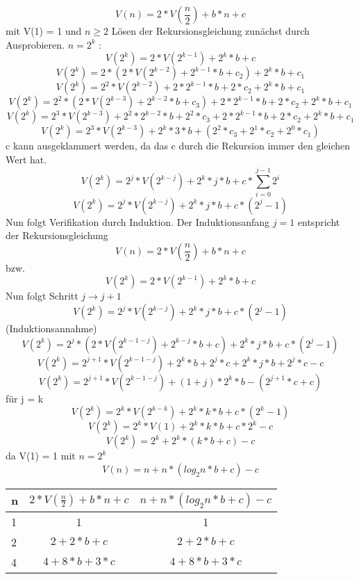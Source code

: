 \documentclass{article}
\begin{document}
\section{}
\[V(n) = 2* V\left(\frac{n}{2}\right)+ b*n +c \] mit V(1) = 1 und $n \geq 2$
\newline
Lösen der Rekursionsgleichung zunächst durch Ausprobieren.
$n = 2^k$ : \[V(2^k) = 2* V\left(2^{k-1}\right)+  2^k*b +c \] 
\[V(2^k) = 2* \left(2*V\left(2^{k-2}\right)+2^{k-1}*b+c_2\right )+  2^k*b +c_1 \] 
\[V(2^k) = 2^2*V\left(2^{k-2}\right)+2*2^{k-1}*b+2*c_2+  2^k*b +c_1 \] 
\[V(2^k) = 2^2*\left(2*V\left(2^{k-3}\right)+2^{k-2}*b+c_3\right)+2*2^{k-1}*b+2*c_2+  2^k*b +c_1 \] 
\[V(2^k) = 2^3*V\left(2^{k-3}\right)+2^2*2^{k-2}*b+2^2*c_3+2*2^{k-1}*b+2*c_2+  2^k*b +c_1 \] 
\[V(2^k) = 2^3*V\left(2^{k-3}\right)+2^{k}*3*b+(2^2*c_3+2^1*c_2+ 2^0*c_1) \] 
\newline
c kann ausgeklammert werden, da das c durch die Rekursion immer den gleichen Wert hat.
\[V(2^k) = 2^j*V\left(2^{k-j}\right)+2^{k}*j*b+ c*\sum_{i=0}^{j-1}{2^i} \] 
\[V(2^k) = 2^j*V\left(2^{k-j}\right)+2^{k}*j*b+ c*(2^j-1) \] 
\newline
Nun folgt Verifikation durch Induktion.
Der Induktionsanfang $j=1$ entspricht der Rekursionsgleichung
\[V(n) = 2* V\left(\frac{n}{2}\right)+ b*n +c \]
bzw.
 \[V(2^k) = 2* V\left(2^{k-1}\right)+  2^k*b +c \] 
 Nun folgt Schritt $j \rightarrow j+1$
\[V(2^k) = 2^j*V\left(2^{k-j}\right)+2^{k}*j*b+ c*(2^j-1) \] (Induktionsannahme)
\[V(2^k) = 2^j*\left(2* V\left(2^{k-1-j}\right)+  2^{k-j}*b +c\right)+2^{k}*j*b+ c*(2^j-1) \] 
\[V(2^k) = 2^{j+1}*V\left(2^{k-1-j}\right)+2^{k}*b +2^j*c+2^k*j*b+2^j*c-c \] 
\[V(2^k) = 2^{j+1}*V\left(2^{k-1-j}\right)+(1+j)*2^k*b-(2^{j+1}*c+c)\] 
\newline
für j = k
\[V(2^k) = 2^k*V\left(2^{k-k}\right)+2^{k}*k*b+ c*(2^k-1) \] 
\[V(2^k) = 2^k*V\left(1\right)+2^{k}*k*b+ c*2^k-c \] 
\[V(2^k) = 2^k+2^{k}*(k*b+ c)-c \]  da V(1) = 1
\newline mit $n=2^k$
\[V(n) = n+n*(log_2n*b+ c)-c \] 
\newline
\begin{center}
\begin{tabular}[h]{l|c|c}
n & $2* V\left(\frac{n}{2}\right)+ b*n +c$ & $ n+n*(log_2n*b+ c)-c$ \\
\hline
1 & 1 & 1 \\
\hline
2 & $2+2*b+c$ & $2+2*b+c$ \\
\hline
4 & $4+8*b+3*c$ & $4+8*b+3*c$ \\
\end{tabular}
\end{center}
\end{document}
